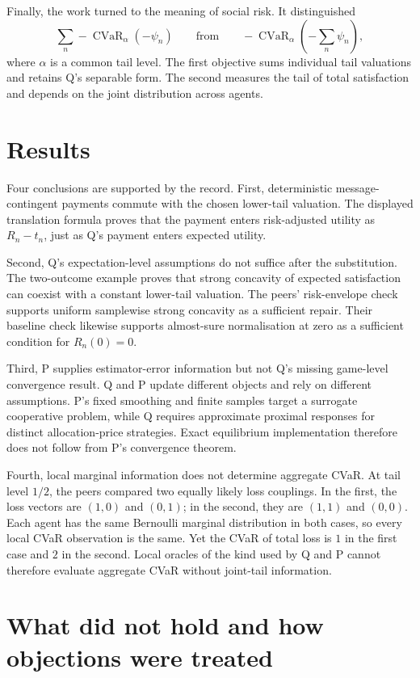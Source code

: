 \documentclass{article}
\begin{document}
Finally, the work turned to the meaning of social risk. It distinguished
\[
\sum_n -\operatorname{CVaR}_{\alpha}(-\psi_n)
\qquad\text{from}\qquad
-\operatorname{CVaR}_{\alpha}\left(-\sum_n\psi_n\right),
\]
where \(\alpha\) is a common tail level. The first objective sums individual tail valuations and retains Q's separable form. The second measures the tail of total satisfaction and depends on the joint distribution across agents.

\section{Results}

Four conclusions are supported by the record. First, deterministic message-contingent payments commute with the chosen lower-tail valuation. The displayed translation formula proves that the payment enters risk-adjusted utility as \(R_n-t_n\), just as Q's payment enters expected utility.

Second, Q's expectation-level assumptions do not suffice after the substitution. The two-outcome example proves that strong concavity of expected satisfaction can coexist with a constant lower-tail valuation. The peers' risk-envelope check supports uniform samplewise strong concavity as a sufficient repair. Their baseline check likewise supports almost-sure normalisation at zero as a sufficient condition for \(R_n(0)=0\).

Third, P supplies estimator-error information but not Q's missing game-level convergence result. Q and P update different objects and rely on different assumptions. P's fixed smoothing and finite samples target a surrogate cooperative problem, while Q requires approximate proximal responses for distinct allocation-price strategies. Exact equilibrium implementation therefore does not follow from P's convergence theorem.

Fourth, local marginal information does not determine aggregate CVaR. At tail level \(1/2\), the peers compared two equally likely loss couplings. In the first, the loss vectors are \((1,0)\) and \((0,1)\); in the second, they are \((1,1)\) and \((0,0)\). Each agent has the same Bernoulli marginal distribution in both cases, so every local CVaR observation is the same. Yet the CVaR of total loss is \(1\) in the first case and \(2\) in the second. Local oracles of the kind used by Q and P cannot therefore evaluate aggregate CVaR without joint-tail information.

\section{What did not hold and how objections were treated}
\end{document}
